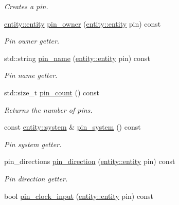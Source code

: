 \begin{DoxyCompactItemize}
\begin{DoxyCompactList}\small\item\em Creates a pin. \end{DoxyCompactList}\item 
\hyperlink{classophidian_1_1entity_1_1entity}{entity\-::entity} \hyperlink{classophidian_1_1standard__cell_1_1standard__cells_ababb1f68b313bbf202aeb63c2b113ef5}{pin\-\_\-owner} (\hyperlink{classophidian_1_1entity_1_1entity}{entity\-::entity} pin) const 
\begin{DoxyCompactList}\small\item\em Pin owner getter. \end{DoxyCompactList}\item 
std\-::string \hyperlink{classophidian_1_1standard__cell_1_1standard__cells_a3a8ff3bb3df8f3c5c77835c99a8d376f}{pin\-\_\-name} (\hyperlink{classophidian_1_1entity_1_1entity}{entity\-::entity} pin) const 
\begin{DoxyCompactList}\small\item\em Pin name getter. \end{DoxyCompactList}\item 
std\-::size\-\_\-t \hyperlink{classophidian_1_1standard__cell_1_1standard__cells_a144aaa53cc5d9808f5d26d51b76fad01}{pin\-\_\-count} () const 
\begin{DoxyCompactList}\small\item\em Returns the number of pins. \end{DoxyCompactList}\item 
const \hyperlink{classophidian_1_1entity_1_1system}{entity\-::system} \& \hyperlink{classophidian_1_1standard__cell_1_1standard__cells_acc1ac0ae7c27a535ac8922d7d7d12581}{pin\-\_\-system} () const 
\begin{DoxyCompactList}\small\item\em Pin system getter. \end{DoxyCompactList}\item 
pin\-\_\-directions \hyperlink{classophidian_1_1standard__cell_1_1standard__cells_a7bab4c82de4b402ec7853befa34696e2}{pin\-\_\-direction} (\hyperlink{classophidian_1_1entity_1_1entity}{entity\-::entity} pin) const 
\begin{DoxyCompactList}\small\item\em Pin direction getter. \end{DoxyCompactList}\item 
bool \hyperlink{classophidian_1_1standard__cell_1_1standard__cells_a3e31812d8491b1dfd8508c27a4568146}{pin\-\_\-clock\-\_\-input} (\hyperlink{classophidian_1_1entity_1_1entity}{entity\-::entity} pin) const 

\end{DoxyCompactItemize}
